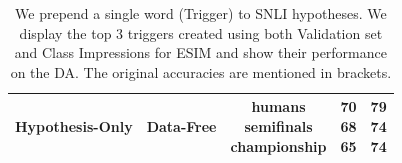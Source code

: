 \begin{table}
{\begin{adjustbox}{max width=\columnwidth}
\begin{tabular}{|c|c|c|c||c|}
\textbf{Hypothesis-Only}& Data-Free &\makecell{humans\\semifinals\\championship} & \makecell{70\\68\\65} &  \makecell{79\\74\\74} \\ \hline
\hline

\end{tabular}
\end{adjustbox}
}
\caption{We prepend a single word (Trigger) to SNLI hypotheses. We display the top 3 triggers created using both Validation set and Class Impressions for ESIM and show their performance on the DA. The original accuracies are mentioned in brackets. }
\label{table:snli-uat}
\end{table}




